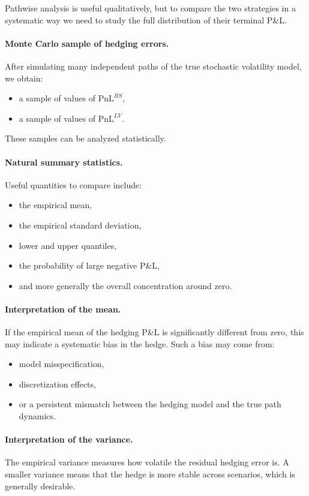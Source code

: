 \documentclass[11pt]{article}
\theoremstyle{plain}
\theoremstyle{definition}
\theoremstyle{remark}
\begin{document}
Pathwise analysis is useful qualitatively, but to compare the two
strategies in a systematic way we need to study the full distribution of
their terminal P\&L.

\paragraph{Monte Carlo sample of hedging errors.}
After simulating many independent paths of the true stochastic
volatility model, we obtain:
\begin{itemize}[leftmargin=1.4em]
    \item a sample of values of \(\mathrm{PnL}^{BS}\),
    \item a sample of values of \(\mathrm{PnL}^{LV}\).
\end{itemize}

These samples can be analyzed statistically.

\paragraph{Natural summary statistics.}
Useful quantities to compare include:
\begin{itemize}[leftmargin=1.4em]
    \item the empirical mean,
    \item the empirical standard deviation,
    \item lower and upper quantiles,
    \item the probability of large negative P\&L,
    \item and more generally the overall concentration around zero.
\end{itemize}

\paragraph{Interpretation of the mean.}
If the empirical mean of the hedging P\&L is significantly different
from zero, this may indicate a systematic bias in the hedge.
Such a bias may come from:
\begin{itemize}[leftmargin=1.4em]
    \item model misspecification,
    \item discretization effects,
    \item or a persistent mismatch between the hedging model and the
    true path dynamics.
\end{itemize}

\paragraph{Interpretation of the variance.}
The empirical variance measures how volatile the residual hedging error
is.
A smaller variance means that the hedge is more stable across scenarios,
which is generally desirable.
\end{document}
